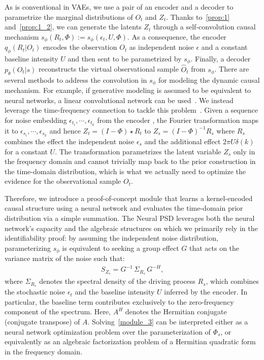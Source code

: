 \documentclass[10pt]{article}
\numberwithin{figure}{section}
\begin{document}
As is conventional in VAEs, we use a pair of an encoder and a decoder to parametrize the marginal distributions of $O_t$ and $Z_t$. Thanks to~\autoref{prop:1} and~\autoref{prop:1_2}, we can generate the latents $Z_t$ through a self-convolution causal mechanism $s_{\phi}(R_t, \Phi):= s_{\phi}(\epsilon_t,U,\Phi )$. As a consequence, the encoder $q_{\phi}(R_t|O_t)$ encodes the observation $O_t$ as independent noise $\epsilon$ and a constant baseline intensity $U$ and then sent to be parametrized by $s_{\phi}$. Finally, a decoder $p_{\theta}(O_t|s)$ reconstructs the virtual observational sample $\hat{O}_t$ from $s_{\phi}$. There are several methods to address the convolution in $s_{\phi}$ for modeling the dynamic causal mechanism. For example, if generative modeling is assumed to be equivalent to neural networks, a linear convolutional network can be used~\citep{kohn_geometry_2021,kohn_function_2023}. We instead leverage the time-frequency connection to tackle this problem~\citep{lima_granger_2020,bacry_hawkes_2014}. Given a sequence for noise embedding $\epsilon_{t_i},\cdots,\epsilon_{t_k}$ from the encoder , the Fourier transformation maps it to $\epsilon_{s_i},\cdots,\epsilon_{s_k}$ and hence $Z_t = (I-\Phi)\star R_t$ to $Z_s = (I-\Phi)^{-1}R_s$ where $R_s$ combines the effect the independent noise $\epsilon_s$ and the additional effect $2\pi U\delta(k)$ for a constant $U$.  The transformation parametrizes the latent variable $Z_s$ only in the frequency domain and cannot trivially map back to the prior construction in the time-domain distribution, which is what we actually need to optimize the evidence for the observational sample $O_t$.

Therefore, we introduce a proof-of-concept module that learns a kernel-encoded causal structure using a neural network and evaluates the time-domain prior distribution via a simple summation. The Neural PSD leverages both the neural network's capacity and the algebraic structures on which we primarily rely in the identifiability proof: by assuming the independent noise distribution, parameterizing $s_{\phi}$ is equivalent to seeking a group effect $G$ that acts on the variance matrix of the noise such that:
\begin{align}
   S_{Z_s}
   =
   G^{-1}\,
   \Sigma_{R_s}\,
   G^{-H},
   \label{module_3}
\end{align}
where $\Sigma_{R_s}$ denotes the spectral density of the driving process $R_s$, which combines the stochastic noise $\epsilon_t$ and the baseline intensity $U$ inferred by the encoder. In particular, the baseline term contributes exclusively to the zero-frequency component of the spectrum. Here, $A^H$ denotes the Hermitian conjugate (conjugate transpose) of $A$. Solving~\eqref{module_3} can be interpreted either as a neural network optimization problem over the parameterization of $\Phi_s$, or equivalently as an algebraic factorization problem of a Hermitian quadratic form in the frequency domain. 
\end{document}
